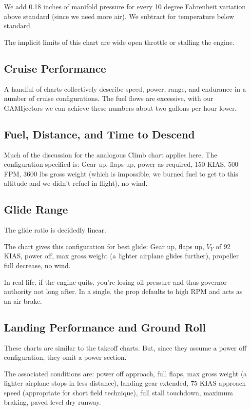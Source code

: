 We add 0.18 inches of manifold pressure for every 10 degree Fahrenheit variation above standard (since we need more air). We subtract for temperature below standard.

The implicit limits of this chart are wide open throttle or stalling the engine.

\subsection{Cruise Performance}

A handful of charts collectively describe speed, power, range, and endurance in a number of cruise configurations. The fuel flows are excessive, with our GAMIjectors we can achieve these numbers about two gallons per hour lower.

\subsection{Fuel, Distance, and Time to Descend}

Much of the discussion for the analogous Climb chart applies here. The configuration specified is: Gear up, flaps up, power as required, 150 KIAS, 500 FPM, 3600 lbs gross weight (which is impossible, we burned fuel to get to this altitude and we didn't refuel in flight), no wind.

\subsection{Glide Range}

The glide ratio is decidedly linear.

The chart gives this configuration for best glide: Gear up, flaps up, $V_Y$ of 92 KIAS, power off, max gross weight (a lighter airplane glides further), propeller full decrease, no wind.

In real life, if the engine quits, you're losing oil pressure and thus governor authority not long after. In a single, the prop defaults to high RPM and acts as an air brake.

\subsection{Landing Performance and Ground Roll}

These charts are similar to the takeoff charts. But, since they assume a power off configuration, they omit a power section.

The associated conditions are: power off approach, full flaps, max gross weight (a lighter airplane stops in less distance), landing gear extended, 75 KIAS approach speed (appropriate for short field technique), full stall touchdown, maximum braking, paved level dry runway.


